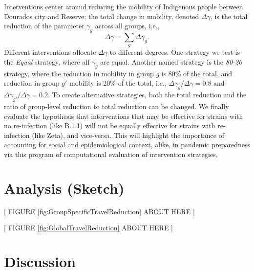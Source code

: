 \documentclass[
  letterpaper,
  abstract]{scrartcl}
\begin{document}
Interventions center around reducing the mobility of Indigenous people between
Dourados city and Reserve; the total change in mobility, denoted $\Delta
\gamma$, is the total reduction of the parameter $\gamma_g$ across all 
groups, i.e., 
\begin{equation}
  \Delta \gamma = \sum_g \Delta \gamma_g.
\end{equation}
\noindent
Different interventions allocate $\Delta \gamma$ to different degrees. 
One strategy we test is the \emph{Equal} strategy, where all $\gamma_g$ are
equal. Another named strategy is the \emph{80-20} strategy, where the
reduction in mobility in group $g$ is 80\% of the total, and reduction in
group $g'$ mobility is 20\% of the total, i.e., $\Delta\gamma_g / \Delta\gamma =
0.8$ and $\Delta\gamma_{g'} / \Delta\gamma = 0.2$. To create alternative
strategies, both the total reduction and the ratio of group-level reduction to 
total reduction can be changed. We finally evaluate the hypothesis that
interventions that may be effective for strains with no re-infection (like
B.1.1) will not be equally effective for strains with re-infection (like Zeta),
and vice-versa. This will highlight the importance of accounting for social and
epidemiological context, alike, in pandemic preparedness via this program of
computational evaluation of intervention strategies.


\section{Analysis (Sketch)}\label{analysis-sketch}



\vspace{0.5em}
\begin{center}
{[ FIGURE \ref{fig:GroupSpecificTravelReduction} ABOUT HERE ]} \\
\end{center}

\vspace{0.5em}
\begin{center}
{[ FIGURE \ref{fig:GlobalTravelReduction} ABOUT HERE ]} \\
\end{center}



\section{Discussion}\label{discussion}
\end{document}
